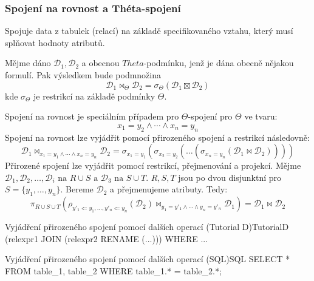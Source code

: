 \subsubsection{Spojení na rovnost a Théta-spojení}
Spojuje data z tabulek (relací) na základě specifikovaného vztahu, který musí splňovat hodnoty atributů.

Mějme dáno $\mathcal{D}_{1}, \mathcal{D}_{2}$ a obecnou $Theta$-podmínku, jenž je dána obecně nějakou formulí. Pak výsledkem bude podmnožina
$$
\mathcal{D}_{1} \Join_{\Theta} \mathcal{D}_{2} = \sigma_{\Theta} (\mathcal{D}_{1} \boxtimes \mathcal{D}_{2})
$$
kde $\sigma_{\Theta}$ je restrikcí na základě podmínky $\Theta$.

Spojení na rovnost je speciálním případem pro $\Theta$-spojení pro $\Theta$ ve tvaru:
$$
x_{1} = y_{2} \land \cdots \land x_{n} = y_{n} 
$$
Spojení na rovnost lze vyjádřit pomocí přirozeného spojení a restrikcí následovně:
$$
\mathcal{D}_{1} \Join_{x_{1} = y_{1} \land \cdots \land x_{n} = y_{n}} \mathcal{D}_{2} = \sigma_{x_{1} = y_{1}} (\sigma_{x_{2} = y_{2}} (\ldots (\sigma_{x_{n} = y_{n}}(\mathcal{D}_{1} \Join \mathcal{D}_{2}))))
$$
Přirozené spojení lze vyjádřit pomocí restrikcí, přejmenování a projekcí. Mějme $\mathcal{D}_{1}, \mathcal{D}_{2}, \ldots, \mathcal{D}_{i} \text{ na } R \cup S \text{ a } \mathcal{D}_{3} \text{ na } S \cup T$. $R, S, T$ jsou po dvou disjunktní pro $S = \lbrace y_{1}, \ldots, y_{n} \rbrace$. Bereme $\mathcal{D}_{2}$ a přejmenujeme atributy. Tedy:
$$
\pi_{R \cup S \cup T} (\rho_{y'_{1} \Leftarrow y_{1}, \ldots, y'_{n} \Leftarrow y_{n}} (\mathcal{D}_{2}) \Join_{y_{1} = y'_{1} \land \cdots \land y_{n} = y'_{n}} \mathcal{D}_{1}) = \mathcal{D}_{1} \Join \mathcal{D}_{2}
$$
\begin{upcode}{Vyjádření přirozeného spojení pomocí dalších operací (Tutorial D)}{}{TutorialD}
(relexpr1 JOIN (relexpr2 RENAME (...))) WHERE ...
\end{upcode}
\begin{upcode}{Vyjádření přirozeného spojení pomocí dalších operací (SQL)}{}{SQL}
SELECT * FROM table_1, table_2 WHERE table_1.* = table_2.*;
\end{upcode}